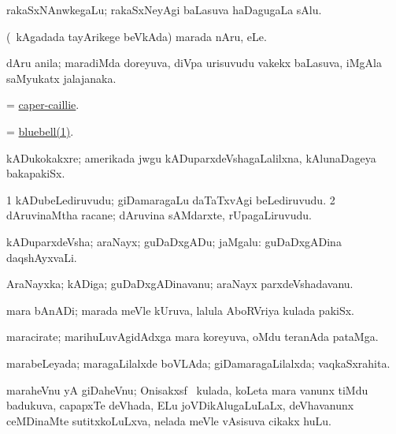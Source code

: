 \bentry
{} 
\gl{\nA}
\expl{}
\bmng
rakaSxNAnwkegaLu; rakaSxNeyAgi baLasuva haDagugaLa sAlu. 
\emng
\eentry

\bentry
{} 
\gl{\nA}
\expl{}
\bmng
(\kanmu\ kAgadada tayArikege beVkAda) marada nAru, eLe. 
\emng
\eentry

\bentry
{} 
\gl{\nA}
\expl{}
\bmng
dAru anila; maradiMda doreyuva, diVpa urisuvudu \mo vakekx baLasuva, iMgAla saMyukatx jalajanaka. 
\emng
\eentry

\bentry
{} 
\gl{\nA}
\expl{}
\bmng
= \hyperref{kandict_c.pdf}{C}{caper-caillie}{caper-caillie}. 
\emng
\eentry

\bentry
{} 
\gl{\nA}
\expl{}
\bmng
= \hyperref{kandict_b.pdf}{B}{bluebell}{bluebell(1)}. 
\emng
\eentry

\bentry
{} 
\gl{\nA}
\expl{}
\bmng
kADukokakxre; amerikada jwgu kADuparxdeVshagaLalilxna, kAlunaDageya bakapakiSx. 
\emng
\eentry

\bentry
{} 
\gl{\nA}
\expl{}
\bmng
\bnum
\num{1} kADubeLediruvudu; giDamaragaLu daTaTxvAgi beLediruvudu. 
\num{2} dAruvinaMtha racane; dAruvina sAMdarxte, rUpagaLiruvudu. 
\enum
\emng
\eentry

\bentry
{} 
\gl{\nA}
\expl{}
\bmng
kADuparxdeVsha; araNayx; guDaDxgADu; jaMgalu:  guDaDxgADina daqshAyxvaLi. 
\emng
\eentry

\bentry
{} 
\gl{\nA}
\expl{}
\bmng
AraNayxka; kADiga; guDaDxgADinavanu; araNayx parxdeVshadavanu. 
\emng
\eentry

\bentry
{} 
\gl{\nA}
\expl{}
\bmng
mara bAnADi; marada meVle kUruva, lalula AboRVriya kulada pakiSx. 
\emng
\eentry

\bentry
{} 
\gl{\nA}
\expl{}
\bmng
maracirate; marihuLuvAgidAdxga mara koreyuva, oMdu teranAda pataMga. 
\emng
\eentry

\bentry
{} 
\gl{\gu}
\expl{}
\bmng
marabeLeyada; maragaLilalxde boVLAda; giDamaragaLilalxda; vaqkaSxrahita. 
\emng
\eentry

\bentry
{} 
\gl{\nA}
\bmng
maraheVnu yA giDaheVnu; Onisakxsf \mo\ kulada, koLeta mara \mo vanunx tiMdu badukuva, capapxTe deVhada, ELu joVDikAlugaLuLaLx, deVhavanunx ceMDinaMte sutitxkoLuLxva, nelada meVle vAsisuva cikakx huLu. 
\emng
\eentry

